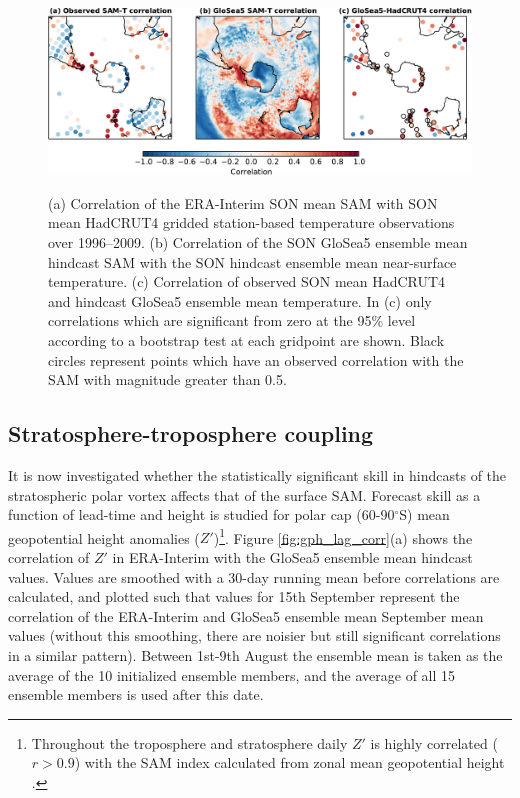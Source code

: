 \begin{figure}[t]
  \noindent\includegraphics[width=\textwidth,angle=0]{figures/chapter-seasonal/mslp_tsrf_maps_crop.pdf}\\
  \caption[Correlation of GloSea5 forecasts of sea-level pressure and
  temperature.]{(a) Correlation of the ERA-Interim SON mean SAM with SON mean
    HadCRUT4 gridded station-based temperature observations over 1996--2009. (b)
    Correlation of the SON GloSea5 ensemble mean hindcast SAM with the SON
    hindcast ensemble mean near-surface temperature. (c) Correlation of observed
    SON mean HadCRUT4 and hindcast GloSea5 ensemble mean temperature. In (c)
    only correlations which are significant from zero at the 95\% level
    according to a bootstrap test at each gridpoint are shown. Black circles
    represent points which have an observed correlation with the SAM with
    magnitude greater than 0.5.}\label{fig:mslp_tsrf_map}
\end{figure}


\subsection{Stratosphere-troposphere coupling}
\label{sec:seas-strat-trop-coupl}

It is now investigated whether the statistically significant skill in hindcasts
of the stratospheric polar vortex affects that of the surface SAM. Forecast
skill as a function of lead-time and height is studied for polar cap
(60-90$^{\circ}$S) mean geopotential height anomalies ($Z'$)\footnote{Throughout
  the troposphere and stratosphere daily $Z'$ is highly correlated ($r>0.9$)
  with the SAM index calculated from zonal mean geopotential height
  \citep{Baldwin2009}.}. Figure \ref{fig:gph_lag_corr}(a) shows the correlation
of $Z'$ in ERA-Interim with the GloSea5 ensemble mean hindcast values. Values
are smoothed with a 30-day running mean before correlations are calculated, and
plotted such that values for 15th September represent the correlation of the
ERA-Interim and GloSea5 ensemble mean September mean values (without this
smoothing, there are noisier but still significant correlations in a similar
pattern). Between 1st-9th August the ensemble mean is taken as the average of
the 10 initialized ensemble members, and the average of all 15 ensemble members
is used after this date.

